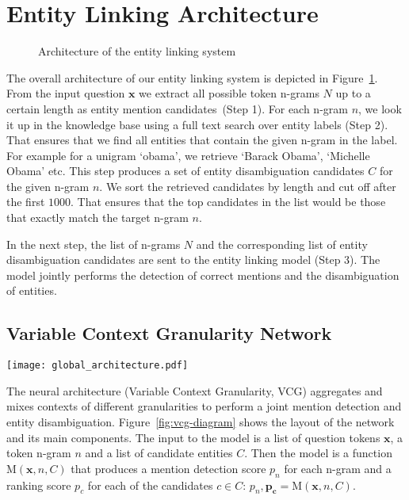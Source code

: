 \documentclass[11pt,a4paper]{article}
\begin{document}
\section{Entity Linking Architecture}
\label{sec:architecture}

\begin{figure}[ht]
  \caption{Architecture of the entity linking system}
  \label{fig:system-diagram}
\end{figure}

The overall architecture of our entity linking system is depicted in Figure~\ref{fig:system-diagram}. From the input question $\mathbf{x}$ we extract all possible token n-grams $N$ up to a certain length as entity mention candidates~(Step 1). For each n-gram $n$, we look it up in the knowledge base using a full text search over entity labels (Step 2). That ensures that we find all entities that contain the given n-gram in the label. For example for a unigram `obama',  we retrieve `Barack Obama', `Michelle Obama' etc. 
This step produces a set of entity disambiguation candidates $C$ for the given n-gram $n$. We sort the retrieved candidates by length and cut off after the first $1000$. 
That ensures that the top candidates in the list would be those that exactly match the target n-gram $n$. 

In the next step, the list of n-grams $N$ and the corresponding list of entity disambiguation candidates are sent to the entity linking model (Step 3). 
The model jointly performs the detection of correct mentions and the disambiguation of entities. 

\subsection{Variable Context Granularity Network}

\begin{figure*}[t]
  {\centering
   \texttt{[image: global\_architecture.pdf]}}
  \caption{The architecture of the Variable Context Granularity Network for a \textit{single} n-gram and an entity candidate. The output vectors $(\mathbf{o_c}, \mathbf{o_t})$ are aggregated over \textit{all} n-grams for the global assignment \label{fig:vcg-diagram}}
\end{figure*}

The neural architecture (Variable Context Granularity, VCG) aggregates and mixes contexts of different granularities to perform a joint mention detection and entity disambiguation. 
Figure~\ref{fig:vcg-diagram} shows the layout of the network and its main components.
The input to the model is a list of question tokens $\mathbf{x}$, a token n-gram $n$ and a list of candidate entities $C$. Then the model is a function $\mathrm{M}(\mathbf{x},n,C)$ that produces a mention detection score $p_n$ for each n-gram and a ranking score $p_c$ for each of the candidates $c \in C$: $p_n, \mathbf{p_c} = \mathrm{M}(\mathbf{x},n,C)$. 
\end{document}
